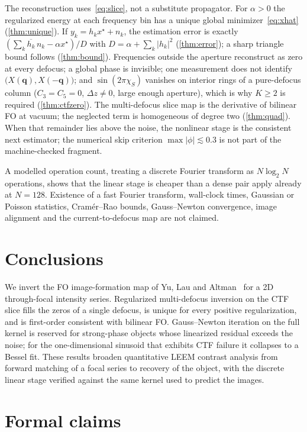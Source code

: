 \documentclass[11pt,a4paper]{article}
\theoremstyle{definition}
\theoremstyle{remark}
\newcommand{\abs}[1]{\lvert#1\rvert}
\newcommand{\Dz}{\Delta z}
\begin{document}
The reconstruction uses~\eqref{eq:slice}, not a substitute
propagator.
For $\alpha>0$ the regularized energy at each frequency bin has a
unique global minimizer~\eqref{eq:xhat} (\cref{thm:unique}).
If $y_k=h_k x^\star+n_k$, the estimation error is exactly
$(\sum_k\overline{h_k}\,n_k-\alpha x^\star)/D$ with
$D=\alpha+\sum_k\abs{h_k}^2$ (\cref{thm:error}); a sharp triangle
bound follows (\cref{thm:bound}).
Frequencies outside the aperture reconstruct as zero at every
defocus; a global phase is invisible; one measurement does not
identify $\bigl(X(\mathbf{q}),X(-\mathbf{q})\bigr)$; and
$\sin(2\pi\chi_S)$ vanishes on interior rings of a pure-defocus
column ($C_3=C_5=0$, $\Dz\neq 0$, large enough aperture), which is
why $K\ge 2$ is required (\cref{thm:ctfzero}).
The multi-defocus slice map is the derivative of bilinear FO at
vacuum; the neglected term is homogeneous of degree two
(\cref{thm:quad}).
When that remainder lies above the noise, the nonlinear stage is
the consistent next estimator; the numerical skip criterion
$\max\abs{\phi}\lesssim 0.3$ is not part of the machine-checked
fragment.

A modelled operation count, treating a discrete Fourier transform as
$N\log_2 N$ operations, shows that the linear stage is cheaper than a
dense pair apply already at $N=128$.
Existence of a fast Fourier transform, wall-clock times, Gaussian or
Poisson statistics, Cram\'er--Rao bounds, Gauss--Newton convergence,
image alignment and the current-to-defocus map are not claimed.

\section{Conclusions}
\label{sec:end}

We invert the FO image-formation map of Yu, Lau and
Altman~\cite{Yu2019} for a 2D through-focal intensity series.
Regularized multi-defocus inversion on the CTF slice fills the zeros
of a single defocus, is unique for every positive regularization, and
is first-order consistent with bilinear FO.
Gauss--Newton iteration on the full kernel is reserved for
strong-phase objects whose linearized residual exceeds the noise;
for the one-dimensional sinusoid that exhibits CTF failure it
collapses to a Bessel fit.
These results broaden quantitative LEEM contrast analysis from
forward matching of a focal series to recovery of the object, with
the discrete linear stage verified against the same kernel used to
predict the images.

\appendix
\section{Formal claims}
\label{app:formal}
\end{document}
